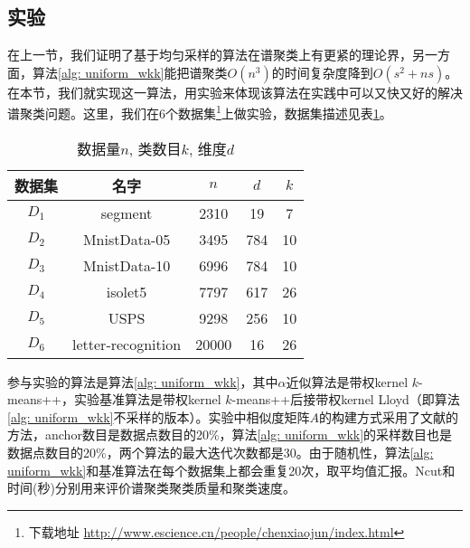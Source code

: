 \subsection{实验}
在上一节，我们证明了基于均匀采样的算法在谱聚类上有更紧的理论界，另一方面，算法\ref{alg: uniform_wkk}能把谱聚类$O(n^3)$的时间复杂度降到$O(s^2+ns)$。在本节，我们就实现这一算法，用实验来体现该算法在实践中可以又快又好的解决谱聚类问题。这里，我们在6个数据集\footnote{下载地址 \url{http://www.escience.cn/people/chenxiaojun/index.html}}上做实验，数据集描述见表\ref{tab:datasets_spectral_clustering}。
\begin{table}[h]
	\caption{数据量$n$, 类数目$k$, 维度$d$}
	\label{tab:datasets_spectral_clustering}
	\begin{tabular}{ccccc}
		\toprule
		数据集 & 名字 & $n$ & $d$ & $k$ \\
		\midrule
		$D_1$ & segment &2310 & 19 & 7 \\
		$D_2$ & MnistData-05 &3495 &784 & 10 \\
		$D_3$ & MnistData-10 &6996 & 784 & 10 \\
		$D_4$ & isolet5 &7797 & 617 & 26 \\
		$D_5$ & USPS &9298 & 256 & 10 \\
		$D_6$ & letter-recognition &20000 & 16 & 26 \\
		\bottomrule
	\end{tabular}
\end{table}

参与实验的算法是算法\ref{alg: uniform_wkk}，其中$\alpha$近似算法是带权kernel $k$-means++，实验基准算法是带权kernel $k$-means++后接带权kernel Lloyd（即算法\ref{alg: uniform_wkk}不采样的版本）。实验中相似度矩阵$A$的构建方式采用了文献\cite{chen2017scalable}的方法，anchor数目是数据点数目的20\%，算法\ref{alg: uniform_wkk}的采样数目也是数据点数目的20\%，两个算法的最大迭代次数都是30。由于随机性，算法\ref{alg: uniform_wkk}和基准算法在每个数据集上都会重复20次，取平均值汇报。Ncut和时间(秒)分别用来评价谱聚类聚类质量和聚类速度。

